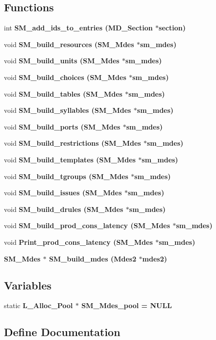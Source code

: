 \subsection*{Functions}
\begin{CompactItemize}
\item 
int \bf{SM\_\-add\_\-ids\_\-to\_\-entries} (\bf{MD\_\-Section} $\ast$section)
\item 
void \bf{SM\_\-build\_\-resources} (\bf{SM\_\-Mdes} $\ast$sm\_\-mdes)
\item 
void \bf{SM\_\-build\_\-units} (\bf{SM\_\-Mdes} $\ast$sm\_\-mdes)
\item 
void \bf{SM\_\-build\_\-choices} (\bf{SM\_\-Mdes} $\ast$sm\_\-mdes)
\item 
void \bf{SM\_\-build\_\-tables} (\bf{SM\_\-Mdes} $\ast$sm\_\-mdes)
\item 
void \bf{SM\_\-build\_\-syllables} (\bf{SM\_\-Mdes} $\ast$sm\_\-mdes)
\item 
void \bf{SM\_\-build\_\-ports} (\bf{SM\_\-Mdes} $\ast$sm\_\-mdes)
\item 
void \bf{SM\_\-build\_\-restrictions} (\bf{SM\_\-Mdes} $\ast$sm\_\-mdes)
\item 
void \bf{SM\_\-build\_\-templates} (\bf{SM\_\-Mdes} $\ast$sm\_\-mdes)
\item 
void \bf{SM\_\-build\_\-tgroups} (\bf{SM\_\-Mdes} $\ast$sm\_\-mdes)
\item 
void \bf{SM\_\-build\_\-issues} (\bf{SM\_\-Mdes} $\ast$sm\_\-mdes)
\item 
void \bf{SM\_\-build\_\-drules} (\bf{SM\_\-Mdes} $\ast$sm\_\-mdes)
\item 
void \bf{SM\_\-build\_\-prod\_\-cons\_\-latency} (\bf{SM\_\-Mdes} $\ast$sm\_\-mdes)
\item 
void \bf{Print\_\-prod\_\-cons\_\-latency} (\bf{SM\_\-Mdes} $\ast$sm\_\-mdes)
\item 
\bf{SM\_\-Mdes} $\ast$ \bf{SM\_\-build\_\-mdes} (\bf{Mdes2} $\ast$mdes2)
\end{CompactItemize}
\subsection*{Variables}
\begin{CompactItemize}
\item 
static \bf{L\_\-Alloc\_\-Pool} $\ast$ \bf{SM\_\-Mdes\_\-pool} = \bf{NULL}
\end{CompactItemize}


\subsection{Define Documentation}
